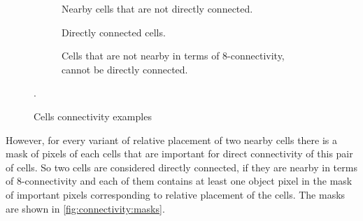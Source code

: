 \documentclass{llncs}
\begin{document}
\begin{figure}
  \centering
  \begin{subfigure}[t]{0.3\linewidth}
    \centering
    \caption{Nearby cells that are not directly connected.}
  \end{subfigure}
  \quad
  \begin{subfigure}[t]{0.3\linewidth}
    \centering
    \caption{Directly connected cells.}
  \end{subfigure}
  \quad
  \begin{subfigure}[t]{0.3\linewidth}
    \centering
    \caption{Cells that are not nearby in terms of 8-connectivity, cannot be
    directly connected.}
  \end{subfigure}
  \caption{Cells connectivity examples}
  \label{fig:connectivity:examples}.
\end{figure}

However, for every variant of relative placement of two nearby cells there is
a mask of pixels of each cells that are important for direct connectivity of
this pair of cells.
So two cells are considered directly connected, if they are nearby
in terms of 8-connectivity and each of them contains at least one object pixel
in the mask of important pixels corresponding to relative placement of the cells.
The masks are shown in \autoref{fig:connectivity:masks}.
\end{document}
